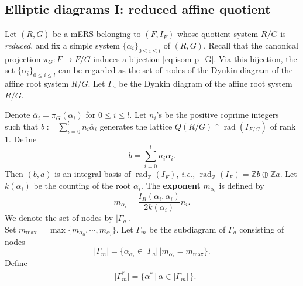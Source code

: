 \documentclass[11pt]{amsart}
\newcommand{\Z}{\mathbb{Z}}
\newcommand{\cod}{\mathrm{cod}}
\newcommand{\rad}{\operatorname{rad}}
\begin{document}
\subsection{Elliptic diagrams I: reduced affine quotient}\label{sect_elliptic-diagram-I}
Let $(R,G)$ be a mERS belonging to $(F,I_F)$ whose quotient system $R/G$ is 
\textit{reduced}, and fix a simple system $\{\alpha_i\}_{0\leq i\leq l}$ of $(R,G)$.
Recall that the canonical projection $\pi_G:F\to F/G$ induces a bijection
\eqref{eq:isom-p_G}. 
Via this bijection, the set $\{\alpha_i\}_{0\leq i\leq l}$ can be
regarded as the set of nodes of the Dynkin diagram of the affine root system $R/G$. 
Let $\Gamma_a$ be the Dynkin diagram of the affine root system 
$R/G$. {Denote $\overline{\alpha}_i=\pi_G(\alpha_i)$ for $0\leq i\leq l$.
Let $n_i$'s be the positive coprime integers  such that 
$\overline{b}:=\sum_{i=0}^l n_i \overline{\alpha}_i$ generates the lattice 
$Q(R/G)\cap \rad(I_{F/G})$ of rank $1$. Define
\begin{equation}\label{defn:b}
b=\sum_{i=0}^l n_i \alpha_i.
\end{equation}
Then $(b,a)$ is an integral basis of $\rad_\Z(I_F)$, {\it i.e.}, 
$\rad_\Z(I_F)=\Z b\oplus \Z a$.  
Let $k(\alpha_i)$ be the counting of the root $\alpha_i$.
The \textbf{exponent} $m_{\alpha_i}$ is defined by
\[ m_{\alpha_i}=\frac{I_R(\alpha_i, \alpha_i)}{2k(\alpha_i)}n_i.\]
We denote the set of 
nodes by $\vert \Gamma_a \vert$. \\

Set $m_{\max}=\max\{m_{\alpha_0}, \cdots, m_{\alpha_l}\}$. Let $\Gamma_m$ be 
the subdiagram of $\Gamma_a$  consisting of nodes 
\[ \vert \Gamma_m \vert=\{ \alpha_{\alpha_i} \in \vert \Gamma_a \vert\, 
\vert m_{\alpha_i}=m_{\max}\}. \]
Define
\begin{align*}
&\vert \Gamma_m^\ast \vert=\{\alpha^\ast\, \vert \, \alpha \in \vert\Gamma_m \vert\, \}.
\end{align*}


}
\end{document}
